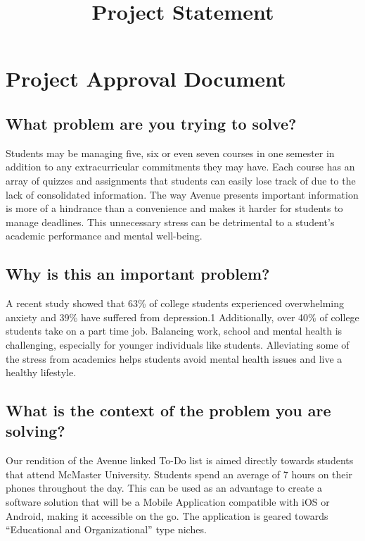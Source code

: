 \documentclass[11pt, oneside]{article}   	%
\title{Project Statement
}
\author{}
\begin{document}
\marginpar{}
\section*{Project Approval Document}
\subsection{What problem are you trying to solve?}

Students may be managing five, six or even seven courses in one semester in addition to any extracurricular commitments they may have. Each course has an array of quizzes and assignments that students can easily lose track of due to the lack of consolidated information. The way Avenue presents important information is more of a hindrance than a convenience and makes it harder for students to manage deadlines. This unnecessary stress can be detrimental to a student's academic performance and mental well-being.

\subsection{Why is this an important problem?}

A recent study showed that 63\% of college students experienced overwhelming anxiety and 39\% have suffered from depression.1 Additionally, over 40\% of college students take on a part time job. Balancing work, school and mental health is challenging, especially for younger individuals like students. Alleviating some of the stress from academics helps students avoid mental health issues and live a healthy lifestyle. 


\subsection{What is the context of the problem you are solving?}

Our rendition of the Avenue linked To-Do list is aimed directly towards students that attend McMaster University. Students spend an average of 7 hours on their phones throughout the day. This can be used as an advantage to create a software solution that will be a Mobile Application compatible with iOS or Android, making it accessible on the go. The application is geared towards “Educational and Organizational” type niches.
\end{document}
